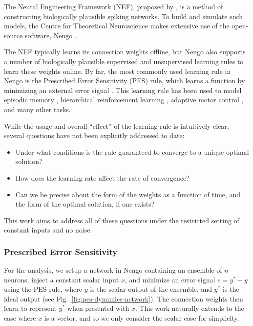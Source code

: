 The Neural Engineering Framework (NEF), proposed by \citet{eliasmith2003a}, is a method of constructing biologically plausible spiking networks. To build and simulate such models, the Centre for Theoretical Neuroscience makes extensive use of the open-source software, Nengo \citep{bekolay2014}. 

The NEF typically learns its connection weights offline, but Nengo also supports a number of biologically plausible supervised and unsupervised learning rules to learn these weights online. By far, the most commonly used learning rule in Nengo is the Prescribed Error Sensitivity (PES) rule, which learns a function by minimizing an external error signal \citep{bekolay2013}. This learning rule has been used to model episodic memory \citep{trujillo2014}, hierarchical reinforcement learning \citep{rasmussen2014b}, adaptive motor control \citep{komer2015}, and many other tasks. 

While the usage and overall ``effect'' of the learning rule is intuitively clear, several questions have not been explicitly addressed to date:

\begin{itemize}
\item Under what conditions is the rule guaranteed to converge to a unique optimal solution?
\item How does the learning rate affect the rate of convergence?
\item Can we be precise about the form of the weights as a function of time, and the form of the optimal solution, if one exists?
\end{itemize}

This work aims to address all of these questions under the restricted setting of constant inputs and no noise.

\subsubsection{Prescribed Error Sensitivity}

For the analysis, we setup a network in Nengo containing an ensemble of $n$ neurons, inject a constant scalar input $x$, and minimize an error signal $e = y^* - y$ using the PES rule, where $y$ is the scalar output of the ensemble, and $y^*$ is the ideal output (see Fig.~\ref{fig:pes-dynamics-network}). The connection weights then learn to represent $y^*$ when presented with $x$. This work naturally extends to the case where $x$ is a vector, and so we only consider the scalar case for simplicity.

